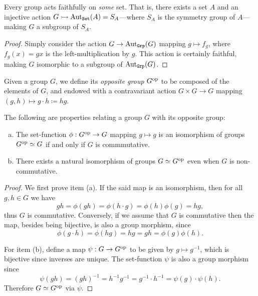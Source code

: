 \begin{theorem}[Cayley]
\label{thm:cayley-faithful}
Every group acts faithfully on \emph{some} set. That is, there exists a set
\(A\) and an injective action \(G \rightarrowtail \operatorname{Aut}_{{\texttt{Set}}}(A) = S_A\)---where \(S_A\)
is the symmetry group of \(A\)---making \(G\) a subgroup of \(S_A\).
\end{theorem}

\begin{proof}
Simply consider the action \(G \to \operatorname{Aut}_{{\texttt{Grp}}}(G)\) mapping \(g \mapsto f_g\),
where \(f_g(x) = g x\) is the left-multiplication by \(g\). This action is
certainly faithful, making \(G\) isomorphic to a subgroup of \(\operatorname{Aut}_{{\texttt{Grp}}}(G)\).
\end{proof}

\begin{definition}
\label{def:opposite-group}
Given a group \(G\), we define its \emph{opposite group} \(G^{\mathrm{op}}\) to be
composed of the elements of \(G\), and endowed with a contravariant action \(G
\times G \to G\) mapping \((g, h) \mapsto g \cdot h \coloneq h g\).
\end{definition}

\begin{corollary}
\label{cor:Gop-iso-G-id-iff-commutative}
The following are properties relating a group \(G\) with its opposite group:
\begin{enumerate}[(a)]\setlength\itemsep{0em}
\item The set-function \(\phi: G^{\mathrm{op}} \to G\) mapping \(g \mapsto g\) is an
  isomorphism of groups \(G^{\mathrm{op}} \simeq G\) if and only if \(G\) is commmutative.

\item There exists a natural isomorphism of groups \(G \simeq G^{\mathrm{op}}\) even when
  \(G\) is non-commutative.
\end{enumerate}
\end{corollary}

\begin{proof}
We first prove item (a). If the said map is an isomorphism, then for all
\(g, h \in G\) we have
\[
g h = \phi(g h) = \phi(h \cdot g) = \phi(h) \phi(g) = h g,
\]
thus \(G\) is commutative. Conversely, if we assume that \(G\) is commutative
then the map, besides being bijective, is also a group morphism, since
\[
\phi(g \cdot h) = \phi(h g) = h g = g h = \phi(g) \phi(h).
\]

For item (b), define a map \(\psi: G \to G^{\mathrm{op}}\) to be given by
\(g \mapsto g^{-1}\), which is bijective since inverses are unique. The
set-function \(\psi\) is also a group morphism since
\[
\psi(g h) = (g h)^{-1} = h^{-1} g^{-1}
= g^{-1} \cdot h^{-1} = \psi(g) \cdot \psi(h).
\]
Therefore \(G \simeq G^{\mathrm{op}}\) via \(\psi\).
\end{proof}

